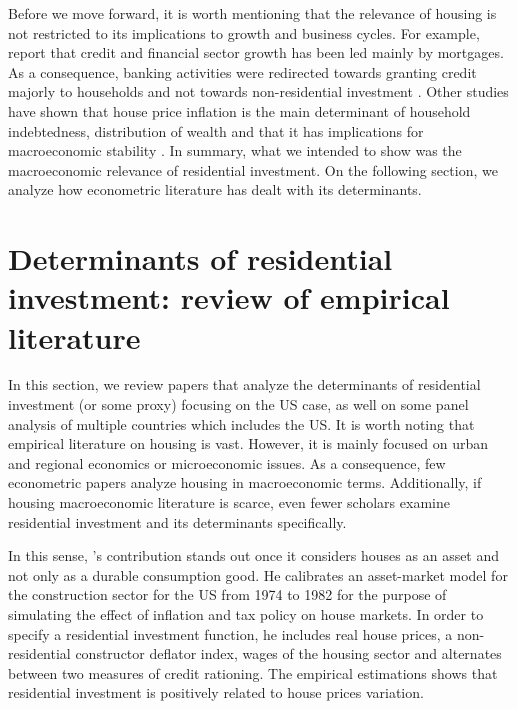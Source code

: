 \documentclass[12pt, a4paper]{article}
\begin{document}
Before we move forward, it is worth mentioning that the relevance of housing is not restricted to its implications to growth and business cycles.
For example, \textcite{jorda_great_2016} report that credit and financial sector growth has been led mainly by mortgages. 
As a consequence, banking activities were redirected towards granting credit majorly to households and not towards non-residential investment \cites{erturk_banks_2007}{kohl_more_2018}.
Other studies have shown that house price inflation is the main determinant of household indebtedness, distribution of wealth and that it has implications for macroeconomic stability \cites{ryoo_household_2015}{stockhammer_debt-driven_2016}{barnes_private_2016}{johnston_global_2017}{mian_household_2017}{anderson_politics_2020}{fuller_housing_2020}.
In summary, what we intended to show was the macroeconomic relevance of residential investment.
On the following section, we analyze how econometric literature has dealt with its determinants.
\section{Determinants of residential investment: review of empirical literature}
\label{sec:orgf796b7e}
\label{sec:empirical_review}
In this section, we review papers that analyze the determinants of residential investment (or some proxy) focusing on the US case, as well on some panel analysis of multiple countries which includes the US.
It is worth noting that empirical literature on housing is vast.
However, it is mainly focused on urban and regional economics or microeconomic issues.
As a consequence, few econometric papers analyze housing in macroeconomic terms.
Additionally, if housing macroeconomic literature is scarce, even fewer scholars examine residential investment and its determinants specifically.

In this sense, \citeauthor*{poterba_tax_1984}'s \citeyear{poterba_tax_1984} contribution stands out once it considers houses as an asset and not only as a durable consumption good.
He calibrates an asset-market model for the construction sector for the US from 1974 to 1982 for the purpose of simulating the effect of inflation and tax policy on house markets.
In order to specify a residential investment function, he includes real house prices, a non-residential constructor deflator index, wages of the housing sector and alternates between two measures  of  credit  rationing.
The empirical estimations shows that residential investment is positively related to house prices variation.
\end{document}

